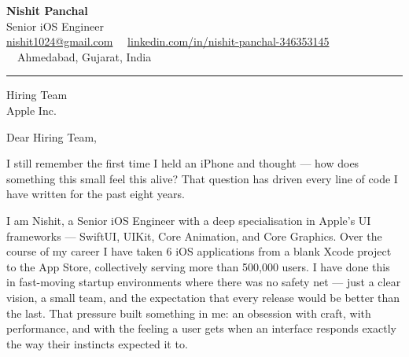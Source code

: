 \documentclass[10pt]{article}
\makeatletter
\def\name{Nishit Panchal}
\def\city{Ahmedabad, Gujarat, India}
\def\email{nishit1024@gmail.com}
\def\LinkedIn{nishit-panchal-346353145}
\def\role{Senior iOS Engineer}
\makeatother
\begin{document}

\begin{center}
    {\Huge \textbf{\name}} \\
    \vspace{0.4em}
    {\color{highlight} \Large \role} \\
    \vspace{0.5em}
    \small{
        \href{mailto:\email}{\email} \ \textbullet \
        \href{https://www.linkedin.com/in/\LinkedIn}{linkedin.com/in/\LinkedIn} \ \textbullet \
        \city
    }
\end{center}

\vspace{1em}
\hrule
\vspace{1.5em}

\noindent
Hiring Team \\
Apple Inc. \\

\vspace{1em}

\noindent Dear Hiring Team,

\vspace{1em}

\noindent
I still remember the first time I held an iPhone and thought --- how does something this small feel this alive? That question has driven every line of code I have written for the past eight years.

\vspace{0.8em}

\noindent
I am Nishit, a Senior iOS Engineer with a deep specialisation in Apple's UI frameworks --- SwiftUI, UIKit, Core Animation, and Core Graphics. Over the course of my career I have taken 6 iOS applications from a blank Xcode project to the App Store, collectively serving more than 500,000 users. I have done this in fast-moving startup environments where there was no safety net --- just a clear vision, a small team, and the expectation that every release would be better than the last. That pressure built something in me: an obsession with craft, with performance, and with the feeling a user gets when an interface responds exactly the way their instincts expected it to.

\vspace{0.8em}
\end{document}
